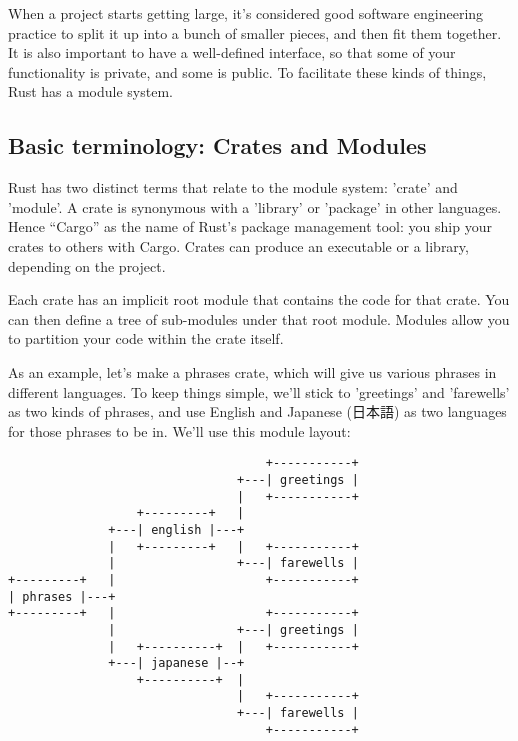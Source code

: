 When a project starts getting large, it's considered good software engineering practice to split it up into a bunch of smaller 
pieces, and then fit them together. It is also important to have a well-defined interface, so that some of your functionality is 
private, and some is public. To facilitate these kinds of things, Rust has a module system.

\subsection*{Basic terminology: Crates and Modules}

Rust has two distinct terms that relate to the module system: 'crate' and 'module'. A crate is synonymous with a 'library' or 
'package' in other languages. Hence “Cargo” as the name of Rust's package management tool: you ship your crates to others with 
Cargo. Crates can produce an executable or a library, depending on the project.

\blank

Each crate has an implicit root module that contains the code for that crate. You can then define a tree of sub-modules under 
that root module. Modules allow you to partition your code within the crate itself.

\blank

As an example, let's make a phrases crate, which will give us various phrases in different languages. To keep things simple, we'll 
stick to 'greetings' and 'farewells' as two kinds of phrases, and use English and Japanese (日本語) as two languages for those phrases 
to be in. We'll use this module layout:

\begin{verbatim}
                                    +-----------+
                                +---| greetings |
                                |   +-----------+
                  +---------+   |
              +---| english |---+
              |   +---------+   |   +-----------+
              |                 +---| farewells |
+---------+   |                     +-----------+
| phrases |---+
+---------+   |                     +-----------+
              |                 +---| greetings |
              |   +----------+  |   +-----------+
              +---| japanese |--+
                  +----------+  |
                                |   +-----------+
                                +---| farewells |
                                    +-----------+
\end{verbatim}

